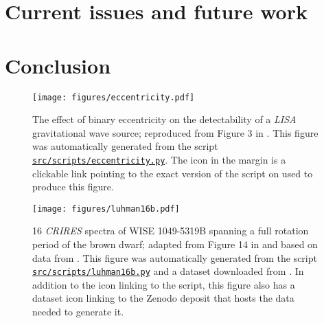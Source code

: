 \documentclass{aastex631}
\newcommand\repoargurl{https://github.com/showyourwork/showyourwork-paper}
\newcommand\fileurl[1]{\repoargurl/blob/\GitHubSHA/#1}
\newcommand\repoargfile[1]{\href{\fileurl{#1}}{\texttt{#1}\xspace}}
\begin{document}


\section{Current issues and future work}
\label{sec:future}

\section{Conclusion}
\label{sec:conclusion}

\clearpage

\begin{figure}[p!]
    \begin{centering}
        \texttt{[image: figures/eccentricity.pdf]}
        \caption{
            The effect of binary eccentricity on the detectability of a \emph{LISA} gravitational wave source; reproduced from Figure 3 in \citet{Wagg2022}. 
            This figure was automatically generated from the script \repoargfile{src/scripts/eccentricity.py}.
            The \GitHub icon in the margin is a clickable link pointing to the exact version of the script on \GitHub used to produce this figure.
        }
        \label{fig:eccentricity}
    \end{centering}
\end{figure}

\begin{figure}[p!]
    \begin{centering}
        \texttt{[image: figures/luhman16b.pdf]}
        \caption{
            16 \emph{CRIRES} spectra of WISE 1049-5319B spanning a full rotation period of the brown dwarf; adapted from Figure 14 in \citet{Luger2021c} and based on data from \citet{Crossfield2014}.
            This figure was automatically generated from the script \repoargfile{src/scripts/luhman16b.py} and a dataset downloaded from \Zenodo.
            In addition to the \GitHub icon linking to the script, this figure also has a dataset icon linking to the Zenodo deposit that hosts the data needed to generate it.
        }
        \label{fig:luhman16b}
    \end{centering}
\end{figure}
\end{document}
